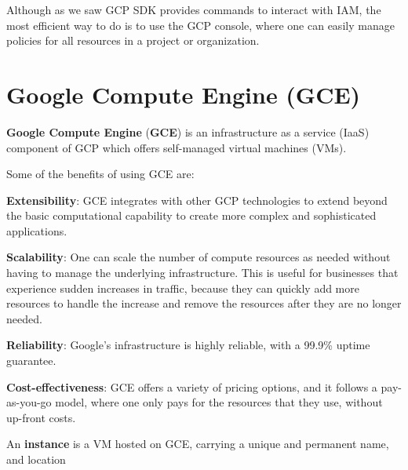 Although as we saw GCP SDK provides commands to interact with IAM, the most efficient way to do is to use the GCP
console, where one can easily manage policies for all resources in a project or organization.

\section{Google Compute Engine (GCE)}

\textbf{Google Compute Engine} (\textbf{GCE}) is an infrastructure as a service (IaaS) component of GCP which offers
self-managed virtual machines (VMs).
\ed

Some of the benefits of using GCE are:
\bit
\item \textbf{Extensibility}: GCE integrates with other GCP technologies to extend beyond the basic computational
capability to create more complex and sophisticated applications.
\item \textbf{Scalability}: One can scale the number of compute resources as needed without having to manage the
underlying infrastructure. This is useful for businesses that experience sudden increases in traffic, because they can
quickly add more resources to handle the increase and remove the resources after they are no longer needed.
\item \textbf{Reliability}: Google's infrastructure is highly reliable, with a 99.9\% uptime guarantee.
\item \textbf{Cost-effectiveness}: GCE offers a variety of pricing options, and it follows a pay-as-you-go model, where
one only pays for the resources that they use, without up-front costs.
\eit

\bd[Instance]
An \textbf{instance} is a VM hosted on GCE\@, carrying a unique and permanent name, and location
\ed

